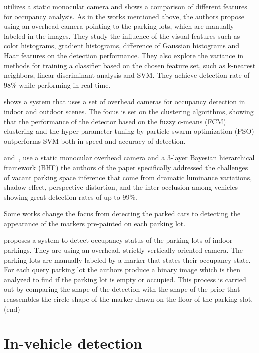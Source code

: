 \cite{tschentscher} utilizes a static monocular camera and shows a comparison
of different features for occupancy analysis. As in the works mentioned above,
the authors propose using an overhead camera pointing to the parking lots,
which are manually labeled in the images. They study the influence of the
visual features such as color histograms, gradient histograms, difference of
Gaussian histograms and Haar features on the detection performance. They also
explore the variance in methods for training a classifier based on the chosen
feature set, such as k-nearest neighbors, linear discriminant analysis and
SVM\@. They achieve detection rate of 98\% while performing in real time.

\cite{ichihashi} shows a system that uses a set of overhead cameras for
occupancy detection in indoor and outdoor scenes. The focus is set on the
clustering algorithms, showing that the performance of the detector based on
the fuzzy c-means (FCM) clustering and the hyper-parameter tuning by particle
swarm optimization (PSO) outperforms SVM both in speed and accuracy of
detection.

\cite{chingchun10} and~\cite{chingjao10}, use a static monocular overhead
camera and a 3-layer Bayesian hierarchical framework  (BHF) the authors of the
paper specifically addressed the challenges of vacant parking space inference
that come from dramatic luminance variations, shadow effect, perspective
distortion, and the inter-occlusion among vehicles showing great detection
rates of up to 99\%.

Some works change the focus from detecting the parked cars to detecting the
appearance of the markers pre-painted on each parking lot.

\cite{yusnita12} proposes a system to detect occupancy status of the parking
lots of indoor parkings. They are using an overhead, strictly vertically
oriented camera. The parking lots are manually labeled by a marker that states
their occupancy state. For each query parking lot the authors produce a binary
image which is then analyzed to find if the parking lot is empty or occupied.
This process is carried out by comparing the shape of the detection with the
shape of the prior that reassembles the circle shape of the marker drawn on
the floor of the parking slot. %
(end)

\section{In-vehicle detection} %
\label{sec:in_vehicle_detection}

